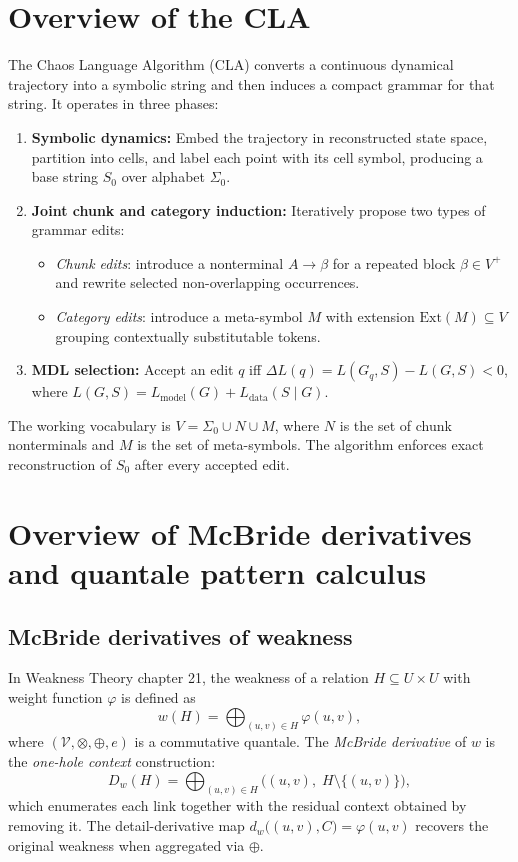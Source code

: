 \documentclass[11pt]{article}
\begin{document}
\section{Overview of the CLA}

The Chaos Language Algorithm (CLA) converts a continuous dynamical trajectory into a symbolic string and then induces a compact grammar for that string.  It operates in three phases:

\begin{enumerate}
  \item \textbf{Symbolic dynamics:} Embed the trajectory in reconstructed state space, partition into cells, and label each point with its cell symbol, producing a base string $S_0$ over alphabet $\Sigma_0$.
  \item \textbf{Joint chunk and category induction:} Iteratively propose two types of grammar edits:
    \begin{itemize}
      \item \emph{Chunk edits}: introduce a nonterminal $A \to \beta$ for a repeated block $\beta \in V^+$ and rewrite selected non-overlapping occurrences.
      \item \emph{Category edits}: introduce a meta-symbol $M$ with extension $\text{Ext}(M) \subseteq V$ grouping contextually substitutable tokens.
    \end{itemize}
  \item \textbf{MDL selection:} Accept an edit $q$ iff $\Delta L(q) = L(G_q, S) - L(G, S) < 0$, where $L(G, S) = L_{\text{model}}(G) + L_{\text{data}}(S \mid G)$.
\end{enumerate}

The working vocabulary is $V = \Sigma_0 \cup N \cup M$, where $N$ is the set of chunk nonterminals and $M$ is the set of meta-symbols.  The algorithm enforces exact reconstruction of $S_0$ after every accepted edit.

\section{Overview of McBride derivatives and quantale pattern calculus}

\subsection{McBride derivatives of weakness}

In Weakness Theory chapter 21, the weakness of a relation $H \subseteq U \times U$ with weight function $\varphi$ is defined as
\[
  w(H) = \bigoplus_{(u,v) \in H} \varphi(u, v),
\]
where $(\mathcal{V}, \otimes, \oplus, e)$ is a commutative quantale.  The \emph{McBride derivative} of $w$ is the \emph{one-hole context} construction:
\[
  D_w(H) = \bigoplus_{(u,v) \in H} \bigl((u,v),\; H \setminus \{(u,v)\}\bigr),
\]
which enumerates each link together with the residual context obtained by removing it.  The detail-derivative map $d_w\bigl((u,v), C\bigr) = \varphi(u,v)$ recovers the original weakness when aggregated via $\oplus$.
\end{document}
